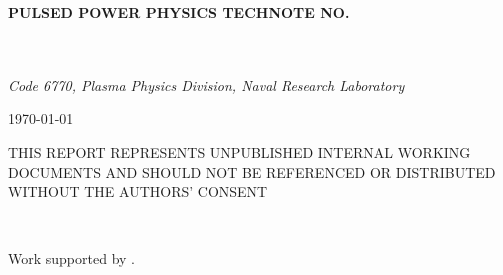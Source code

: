 \documentclass[12pt]{article}
\begin{document}

\graphicspath{{./fig/}}
\begin{titlepage}

\rmfamily
\begin{center}\sffamily\bfseries
PULSED POWER PHYSICS TECHNOTE NO. \notenumber{}\\
{~}
\end{center}

\begin{description}[leftmargin=8em,style=nextline,font=\sffamily\bfseries ]
\item[TITLE:]{\bfseries 
\notetitle{}
}
\item[AUTHORS:]{ \noteauthors{}\\
{\itshape Code 6770, Plasma Physics Division, Naval Research Laboratory}}
\item[DATE:]\today
\item[ABSTRACT:] 
\noteabstract{}
\end{description}

\vfill

{\small
\noindent THIS REPORT REPRESENTS UNPUBLISHED INTERNAL WORKING DOCUMENTS AND SHOULD NOT BE REFERENCED OR DISTRIBUTED WITHOUT THE AUTHORS' CONSENT

{~}

\noindent * Work supported by \notesponsor{}. 
}
\end{titlepage}

\pagestyle{myheadings}
\end{document}
